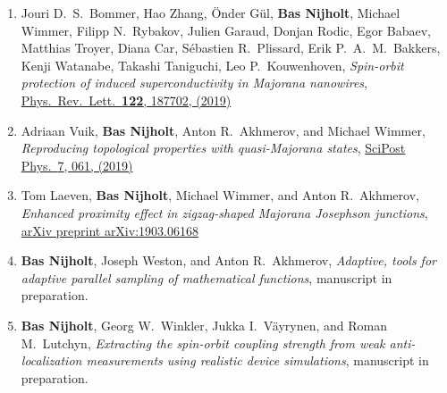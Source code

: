 \begin{enumerate}
\item Jouri D.~S.~Bommer, Hao Zhang, {\"O}nder G{\"u}l, \textbf{Bas Nijholt}, Michael Wimmer, Filipp N.~Rybakov, Julien Garaud, Donjan Rodic, Egor Babaev, Matthias Troyer, Diana Car, S{\'e}bastien R.~Plissard, Erik P.~A.~M.~Bakkers, Kenji Watanabe, Takashi Taniguchi, Leo P.~Kouwenhoven, \textit{Spin-orbit protection of induced superconductivity in Majorana nanowires}, \href{https://doi.org/10.1103/PhysRevLett.122.187702}{Phys.~Rev.~Lett.~\textbf{122}, 187702, (2019)}

\item Adriaan Vuik, \textbf{Bas Nijholt}, Anton R.~Akhmerov, and Michael Wimmer, \textit{Reproducing topological properties with quasi-Majorana states}, \href{https://doi.org/10.21468/SciPostPhys.7.5.061}{SciPost Phys.~\textrm{7}, 061, (2019)}

\item Tom Laeven, \textbf{Bas Nijholt}, Michael Wimmer, and Anton R.~Akhmerov, \textit{Enhanced proximity effect in zigzag-shaped Majorana Josephson junctions}, \href{https://arxiv.org/abs/1903.06168}{arXiv preprint arXiv:1903.06168}

\item \textbf{Bas Nijholt}, Joseph Weston, and Anton R.~Akhmerov, \textit{Adaptive, tools for adaptive parallel sampling of mathematical functions}, manuscript in preparation.

\item \textbf{Bas Nijholt}, Georg W.~Winkler, Jukka I.~V{\"a}yrynen, and Roman M.~Lutchyn, \textit{Extracting the spin-orbit coupling strength from weak anti-localization measurements using realistic device simulations}, manuscript in preparation.

\end{enumerate}

